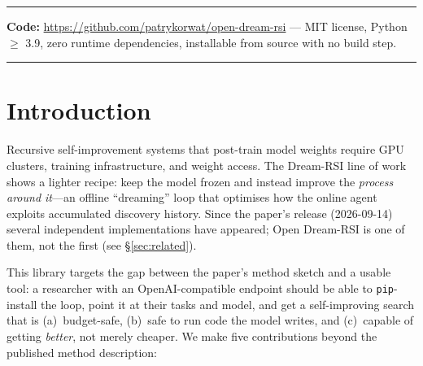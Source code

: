 \documentclass[11pt,a4paper]{article}
\begin{document}
\vspace{0.5em}
\hrule
\vspace{0.3em}
\small
\textbf{Code:} \url{https://github.com/patrykorwat/open-dream-rsi} ---
MIT license, Python $\geq$ 3.9, zero runtime dependencies, installable from
source with no build step.
\vspace{0.3em}
\hrule
\normalsize

\section{Introduction}

Recursive self-improvement systems that post-train model weights
\cite{openrsi} require GPU clusters, training infrastructure, and
weight access. The Dream-RSI line of work \cite{dreamrsi} shows a lighter
recipe: keep the model frozen and instead improve the \emph{process around
it}---an offline ``dreaming'' loop that optimises how the online agent
exploits accumulated discovery history. Since the paper's release
(2026-09-14) several independent implementations have appeared; Open
Dream-RSI is one of them, not the first (see \S\ref{sec:related}).

This library targets the gap between the paper's method sketch and a usable
tool: a researcher with an OpenAI-compatible endpoint should be able to
\texttt{pip}-install the loop, point it at their tasks and model, and get a
self-improving search that is (a)~budget-safe, (b)~safe to run code the model
writes, and (c)~capable of getting \emph{better}, not merely cheaper. We make
five contributions beyond the published method description:
\end{document}
